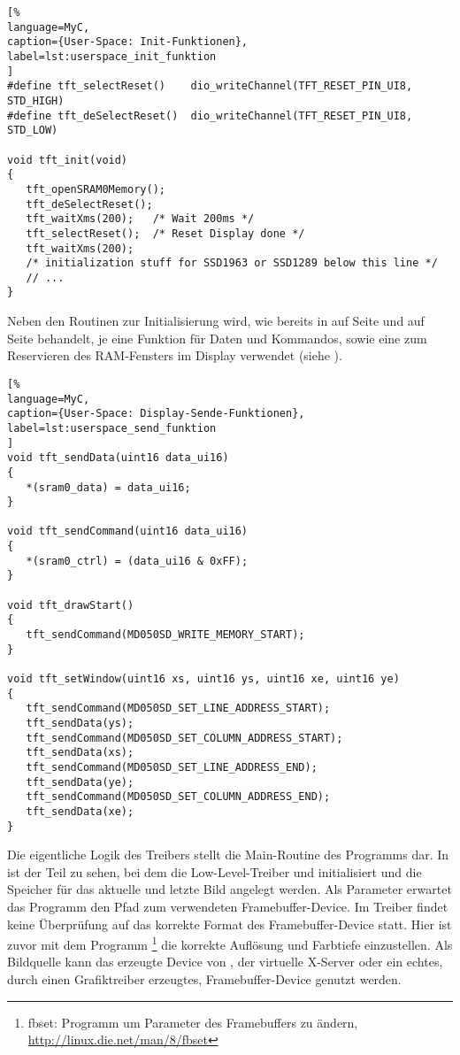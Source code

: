 \begin{lstlisting}[%
language=MyC,
caption={User-Space: Init-Funktionen},
label=lst:userspace_init_funktion
]
#define tft_selectReset()    dio_writeChannel(TFT_RESET_PIN_UI8, STD_HIGH)
#define tft_deSelectReset()  dio_writeChannel(TFT_RESET_PIN_UI8, STD_LOW)

void tft_init(void)
{
   tft_openSRAM0Memory();
   tft_deSelectReset();
   tft_waitXms(200);   /* Wait 200ms */
   tft_selectReset();  /* Reset Display done */
   tft_waitXms(200);
   /* initialization stuff for SSD1963 or SSD1289 below this line */
   // ...
}
\end{lstlisting}
Neben den Routinen zur Initialisierung wird, wie bereits in  auf Seite \pageref{lst:apex_erster_teil} und  auf Seite \pageref{lst:send_funktion} behandelt, je eine Funktion für Daten und Kommandos, sowie eine zum Reservieren des RAM-Fensters im Display verwendet (siehe ).

\begin{lstlisting}[%
language=MyC,
caption={User-Space: Display-Sende-Funktionen},
label=lst:userspace_send_funktion
]
void tft_sendData(uint16 data_ui16)
{
   *(sram0_data) = data_ui16;
}

void tft_sendCommand(uint16 data_ui16)
{
   *(sram0_ctrl) = (data_ui16 & 0xFF);
}

void tft_drawStart()
{
   tft_sendCommand(MD050SD_WRITE_MEMORY_START);
}

void tft_setWindow(uint16 xs, uint16 ys, uint16 xe, uint16 ye)
{
   tft_sendCommand(MD050SD_SET_LINE_ADDRESS_START);
   tft_sendData(ys);
   tft_sendCommand(MD050SD_SET_COLUMN_ADDRESS_START);
   tft_sendData(xs);
   tft_sendCommand(MD050SD_SET_LINE_ADDRESS_END);
   tft_sendData(ye);
   tft_sendCommand(MD050SD_SET_COLUMN_ADDRESS_END);
   tft_sendData(xe);
}
\end{lstlisting}
Die eigentliche Logik des Treibers stellt die Main-Routine des Programms dar. In  ist der Teil zu sehen, bei dem die Low-Level-Treiber  und  initialisiert und die Speicher für das aktuelle und letzte Bild angelegt werden. Als Parameter erwartet das Programm den Pfad zum verwendeten Framebuffer-Device. Im Treiber findet keine Überprüfung auf das korrekte Format des Framebuffer-Device statt. Hier ist zuvor mit dem Programm \footnote{fbset: Programm um Parameter des Framebuffers zu ändern, \url{http://linux.die.net/man/8/fbset}} die korrekte Auflösung und Farbtiefe einzustellen. Als Bildquelle kann das erzeugte Device  von , der virtuelle X-Server  oder ein echtes, durch einen Grafiktreiber erzeugtes, Framebuffer-Device genutzt werden. 

